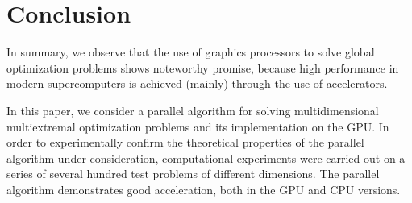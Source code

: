 \documentclass{svproc}
\begin{document}
\section{Conclusion}

In summary, we observe that the use of graphics processors to solve global optimization problems shows noteworthy promise, because high performance in modern supercomputers is achieved (mainly) through the use of accelerators.

In this paper, we consider a parallel algorithm for solving multidimensional multiextremal optimization problems and its implementation on the GPU. In order to experimentally confirm the theoretical properties of the parallel algorithm under consideration, computational experiments were carried out on a series of several hundred test problems of different dimensions. The parallel algorithm demonstrates good acceleration, both in the GPU and CPU versions.


%
%

{}
\end{document}
